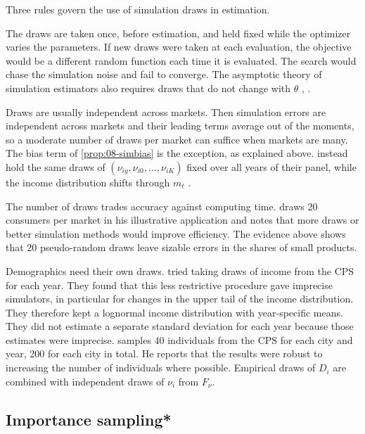 Three rules govern the use of simulation draws in estimation.

The draws are taken once, before estimation, and held fixed while the optimizer varies the parameters. If new
draws were taken at each evaluation, the objective would be a different random function each time it is
evaluated. The search would chase the simulation noise and fail to converge. The asymptotic theory of simulation
estimators also requires draws that do not change with $\theta$ \citep[p.~867]{BerryLevinsohnPakes1995},
\citep{PakesPollard1989}.

Draws are usually independent across markets. Then simulation errors are independent across markets and their
leading terms average out of the moments, so a moderate number of draws per market can suffice when markets are
many. The bias term of \cref{prop:08-simbias} is the exception, as explained above. \citet{BerryLevinsohnPakes1995}
instead hold the same draws of $(\nu_{iy}, \nu_{i0}, \dots, \nu_{iK})$ fixed over all years of their panel, while the
income distribution shifts through $m_t$ \citep[p.~868]{BerryLevinsohnPakes1995}.

The number of draws trades accuracy against computing time. \citet[pp.~538, 540]{Nevo2000a} draws 20 consumers per market
in his illustrative application and notes that more draws or better simulation methods would improve efficiency.
The evidence above shows that 20 pseudo-random draws leave sizable errors in the shares of small products.

Demographics need their own draws. \citet[p.~868, n.~21]{BerryLevinsohnPakes1995} tried taking draws of income from the
CPS for each year. They found that this less restrictive procedure gave imprecise simulators, in particular for
changes in the upper tail of the income distribution. They therefore kept a lognormal income distribution with
year-specific means. They did not estimate a separate standard deviation for each year because those estimates were
imprecise. \citet[n.~25]{Nevo2001} samples 40 individuals from the CPS for each city and year, 200 for each city in
total. He reports that the results were robust to increasing the number of individuals where possible. Empirical
draws of $D_i$ are combined with independent draws of $\nu_i$ from $F_\nu$.

\subsection{Importance sampling*}\label{sec:08-importance}

